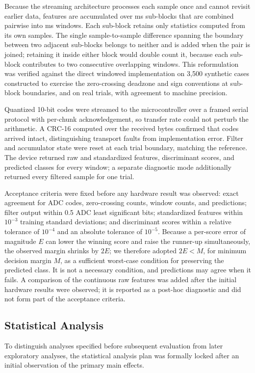 \documentclass[preprint,12pt]{elsarticle}
\begin{document}
Because the streaming architecture processes each sample once and cannot revisit earlier data, features are accumulated over \stepMs{} ms sub-blocks that are combined pairwise into \windowMs{} ms windows. Each sub-block retains only statistics computed from its own samples. The single sample-to-sample difference spanning the boundary between two adjacent sub-blocks belongs to neither and is added when the pair is joined; retaining it inside either block would double count it, because each sub-block contributes to two consecutive overlapping windows. This reformulation was verified against the direct windowed implementation on 3,500 synthetic cases constructed to exercise the zero-crossing deadzone and sign conventions at sub-block boundaries, and on real trials, with agreement to machine precision.

Quantized 10-bit codes were streamed to the microcontroller over a framed serial protocol with per-chunk acknowledgement, so transfer rate could not perturb the arithmetic. A CRC-16 computed over the received bytes confirmed that codes arrived intact, distinguishing transport faults from implementation error. Filter and accumulator state were reset at each trial boundary, matching the reference. The device returned raw and standardized features, discriminant scores, and predicted classes for every window; a separate diagnostic mode additionally returned every filtered sample for one trial.

Acceptance criteria were fixed before any hardware result was observed: exact agreement for ADC codes, zero-crossing counts, window counts, and predictions; filter output within 0.5 ADC least significant bits; standardized features within $10^{-3}$ training standard deviations; and discriminant scores within a relative tolerance of $10^{-4}$ and an absolute tolerance of $10^{-5}$. Because a per-score error of magnitude $E$ can lower the winning score and raise the runner-up simultaneously, the observed margin shrinks by $2E$; we therefore adopted $2E < M$, for minimum decision margin $M$, as a sufficient worst-case condition for preserving the predicted class. It is not a necessary condition, and predictions may agree when it fails. A comparison of the continuous raw features was added after the initial hardware results were observed; it is reported as a post-hoc diagnostic and did not form part of the acceptance criteria.

\subsection{Statistical Analysis}
To distinguish analyses specified before subsequent evaluation from later exploratory analyses, the statistical analysis plan was formally locked after an initial observation of the primary main effects.
\end{document}

